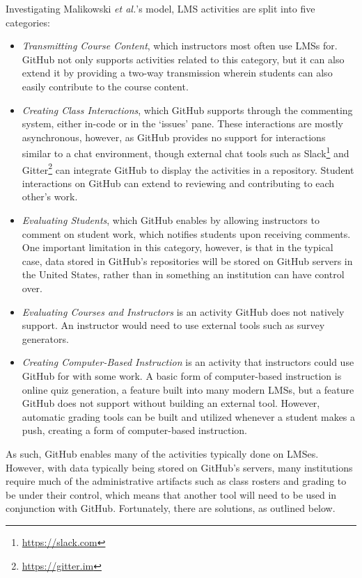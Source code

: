 Investigating Malikowski \textit{et al.}'s \cite{malikowski2007model} model, LMS activities are split into five categories:
\begin{itemize}
\item \emph{Transmitting Course Content}, which instructors most often use LMSs for. GitHub not only supports activities related to this category, but it can also extend it by providing a two-way transmission wherein students can also easily contribute to the course content.
\item \emph{Creating Class Interactions}, which GitHub supports through the commenting system, either in-code or in the `issues' pane. These interactions are mostly asynchronous, however, as GitHub provides no support for interactions similar to a chat environment, though external chat tools such as Slack\footnote{\url{https://slack.com}} and Gitter\footnote{\url{https://gitter.im}} can integrate GitHub to display the activities in a repository. Student interactions on GitHub can extend to reviewing and contributing to each other's work.
\item \emph{Evaluating Students}, which GitHub enables by allowing instructors to comment on student work, which notifies students upon receiving comments. One important limitation in this category, however, is that in the typical case, data stored in GitHub's repositories will be stored on GitHub servers in the United States, rather than in something an institution can have control over.
\item \emph{Evaluating Courses and Instructors} is an activity GitHub does not natively support. An instructor would need to use external tools such as survey generators.
\item \emph{Creating Computer-Based Instruction} is an activity that instructors could use GitHub for with some work. A basic form of computer-based instruction is online quiz generation, a feature built into many modern LMSs, but a feature GitHub does not support without building an external tool. However, automatic grading tools can be built and utilized whenever a student makes a push, creating a form of computer-based instruction.
\end{itemize}

As such, GitHub enables many of the activities typically done on LMSes. However, with data typically being stored on GitHub's servers, many institutions require much of the administrative artifacts such as class rosters and grading to be under their control, which means that another tool will need to be used in conjunction with GitHub. Fortunately, there are solutions, as outlined below.

